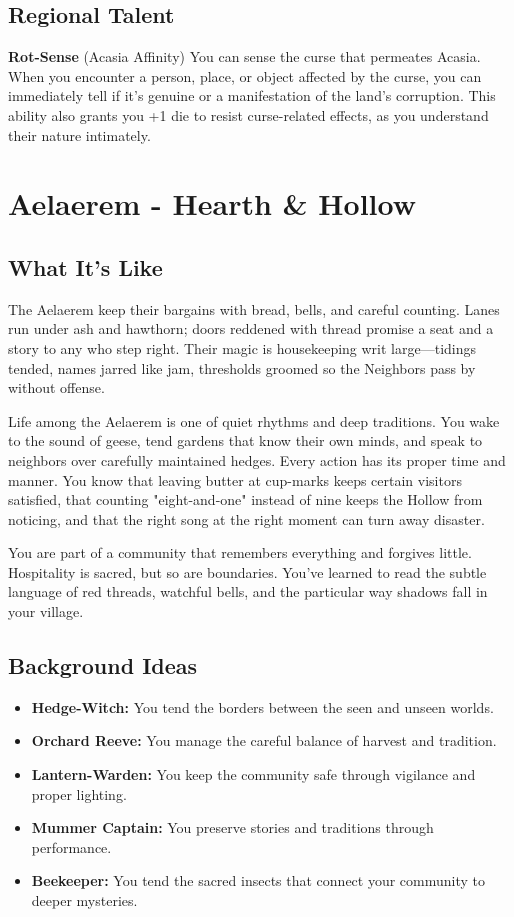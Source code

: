 \documentclass[11pt]{article}
\newcommand{\region}[1]{\section*{#1}}
\newcommand{\subregion}[1]{\subsection*{#1}}
\begin{document}
\begin{multicols}{2}
\subregion{Regional Talent}

\textbf{Rot-Sense} (Acasia Affinity)
You can sense the curse that permeates Acasia. When you encounter a person, place, or object affected by the curse, you can immediately tell if it's genuine or a manifestation of the land's corruption. This ability also grants you +1 die to resist curse-related effects, as you understand their nature intimately.

\end{multicols}

\region{Aelaerem - Hearth \& Hollow}

\begin{multicols}{2}
\subregion{What It's Like}

The Aelaerem keep their bargains with bread, bells, and careful counting. Lanes run under ash and hawthorn; doors reddened with thread promise a seat and a story to any who step right. Their magic is housekeeping writ large—tidings tended, names jarred like jam, thresholds groomed so the Neighbors pass by without offense.

Life among the Aelaerem is one of quiet rhythms and deep traditions. You wake to the sound of geese, tend gardens that know their own minds, and speak to neighbors over carefully maintained hedges. Every action has its proper time and manner. You know that leaving butter at cup-marks keeps certain visitors satisfied, that counting "eight-and-one" instead of nine keeps the Hollow from noticing, and that the right song at the right moment can turn away disaster.

You are part of a community that remembers everything and forgives little. Hospitality is sacred, but so are boundaries. You've learned to read the subtle language of red threads, watchful bells, and the particular way shadows fall in your village.

\columnbreak

\subregion{Background Ideas}

\begin{itemize}[leftmargin=*]
    \item \textbf{Hedge-Witch:} You tend the borders between the seen and unseen worlds.
    \item \textbf{Orchard Reeve:} You manage the careful balance of harvest and tradition.
    \item \textbf{Lantern-Warden:} You keep the community safe through vigilance and proper lighting.
    \item \textbf{Mummer Captain:} You preserve stories and traditions through performance.
    \item \textbf{Beekeeper:} You tend the sacred insects that connect your community to deeper mysteries.
\end{itemize}


\end{multicols}
\end{document}
